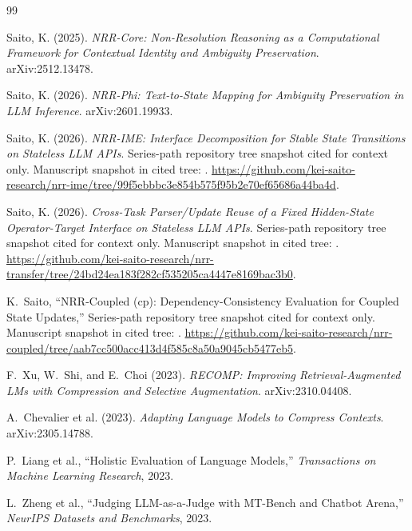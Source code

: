 \documentclass[11pt,a4paper]{article}
\begin{document}
\begin{thebibliography}{99}\sloppy

Saito, K. (2025).
\textit{NRR-Core: Non-Resolution Reasoning as a Computational Framework for Contextual Identity and Ambiguity Preservation}.
arXiv:2512.13478.

Saito, K. (2026).
\textit{NRR-Phi: Text-to-State Mapping for Ambiguity Preservation in LLM Inference}.
arXiv:2601.19933.

Saito, K. (2026).
\textit{NRR-IME: Interface Decomposition for Stable State Transitions on Stateless LLM APIs}.
Series-path repository tree snapshot cited for context only. Manuscript snapshot in cited tree: . \url{https://github.com/kei-saito-research/nrr-ime/tree/99f5ebbbc3e854b575f95b2e70ef65686a44ba4d}.

Saito, K. (2026).
\textit{Cross-Task Parser/Update Reuse of a Fixed Hidden-State Operator-Target Interface on Stateless LLM APIs}.
Series-path repository tree snapshot cited for context only. Manuscript snapshot in cited tree: . \url{https://github.com/kei-saito-research/nrr-transfer/tree/24bd24ea183f282cf535205ca4447e8169bac3b0}.

K.~Saito,
\newblock ``NRR-Coupled (cp): Dependency-Consistency Evaluation for Coupled State Updates,''
\newblock Series-path repository tree snapshot cited for context only. Manuscript snapshot in cited tree:
.
\url{https://github.com/kei-saito-research/nrr-coupled/tree/aab7cc500acc413d4f585c8a50a9045cb5477eb5}.

F.~Xu, W.~Shi, and E.~Choi (2023).
\textit{RECOMP: Improving Retrieval-Augmented LMs with Compression and Selective Augmentation}.
arXiv:2310.04408.

A.~Chevalier et al. (2023). \textit{Adapting Language Models to Compress Contexts}. arXiv:2305.14788.

P.~Liang et al.,
\newblock ``Holistic Evaluation of Language Models,''
\newblock \emph{Transactions on Machine Learning Research}, 2023.

L.~Zheng et al.,
\newblock ``Judging LLM-as-a-Judge with MT-Bench and Chatbot Arena,''
\newblock \emph{NeurIPS Datasets and Benchmarks}, 2023.


\end{thebibliography}
\end{document}
